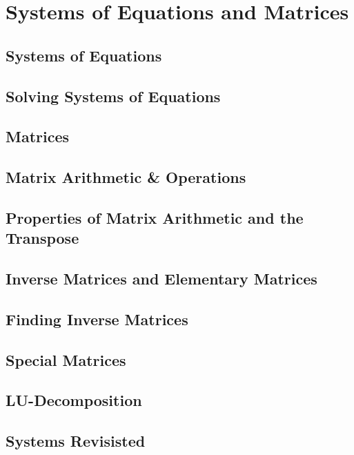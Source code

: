 \documentclass[../satmath.tex]{subfiles}
\begin{document}
\chapter{Systems of Equations and Matrices}
\section{Systems of Equations}
\section{Solving Systems of Equations}
\section{Matrices}
\section{Matrix Arithmetic \& Operations}
\section{Properties of Matrix Arithmetic and the Transpose}
\section{Inverse Matrices and Elementary Matrices}
\section{Finding Inverse Matrices}
\section{Special Matrices}
\section{LU-Decomposition}
\section{Systems Revisisted}
\end{document}
